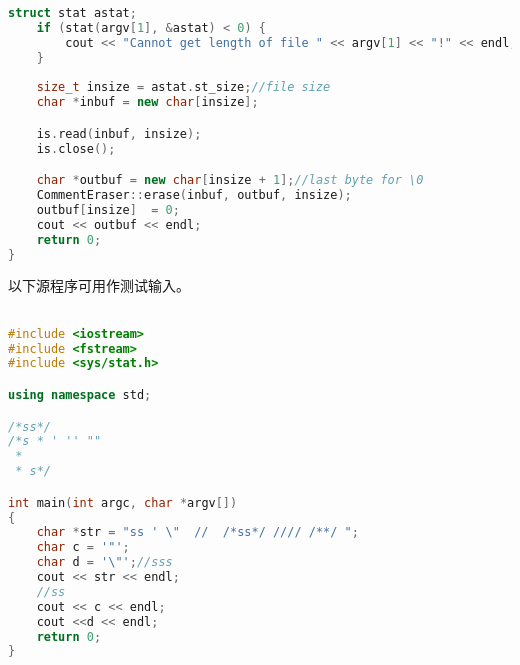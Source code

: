 \begin{lstlisting}[language=C++]
    struct stat astat;
    if (stat(argv[1], &astat) < 0) {
        cout << "Cannot get length of file " << argv[1] << "!" << endl;
    }
    
    size_t insize = astat.st_size;//file size
    char *inbuf = new char[insize]; 

    is.read(inbuf, insize);
    is.close();

    char *outbuf = new char[insize + 1];//last byte for \0
    CommentEraser::erase(inbuf, outbuf, insize); 
    outbuf[insize]  = 0;
    cout << outbuf << endl;
    return 0;
}


\end{lstlisting}

以下源程序可用作测试输入。
\begin{lstlisting}[language=C++]

#include <iostream>
#include <fstream>
#include <sys/stat.h>

using namespace std;

/*ss*/
/*s * ' '' "" 
 *
 * s*/

int main(int argc, char *argv[])
{
    char *str = "ss ' \"  //  /*ss*/ //// /**/ ";
    char c = '"';
    char d = '\"';//sss
    cout << str << endl;
    //ss
    cout << c << endl;
    cout <<d << endl;
    return 0;
}
\end{lstlisting}
